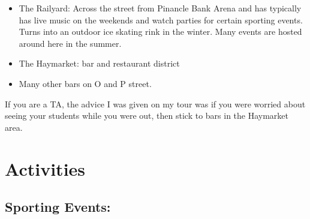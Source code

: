 \documentclass[
  12pt,
]{book}
\providecommand{\tightlist}{%
  \setlength{\itemsep}{0pt}\setlength{\parskip}{0pt}}
\begin{document}
\begin{itemize}
\tightlist
\item
  The Railyard: Across the street from Pinancle Bank Arena and has typically has live music on the weekends and watch parties for certain sporting events. Turns into an outdoor ice skating rink in the winter. Many events are hosted around here in the summer.
\item
  The Haymarket: bar and restaurant district
\item
  Many other bars on O and P street.
\end{itemize}

If you are a TA, the advice I was given on my tour was if you were worried about seeing your students while you were out, then stick to bars in the Haymarket area.

\hypertarget{activities}{%
\section{Activities}\label{activities}}

\hypertarget{sporting-events}{%
\subsection{Sporting Events:}\label{sporting-events}}
\end{document}
